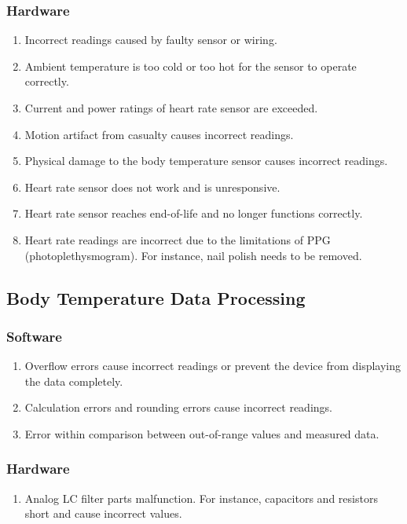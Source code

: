 \documentclass{article}
\begin{document}
        \subsubsection{Hardware}
        \begin{enumerate}[label = (\alph*)]
            \item Incorrect readings caused by faulty sensor or wiring.
            \item Ambient temperature is too cold or too hot for the sensor to operate correctly.
            \item Current and power ratings of heart rate sensor are exceeded.
            \item Motion artifact from casualty causes incorrect readings.
            \item Physical damage to the body temperature sensor causes incorrect readings.
            \item Heart rate sensor does not work and is unresponsive.
            \item Heart rate sensor reaches end-of-life and no longer functions correctly.
            \item Heart rate readings are incorrect due to the limitations of PPG (photoplethysmogram).  For instance, nail polish needs to be removed.
        \end{enumerate}
        
    \subsection{Body Temperature Data Processing}
        \subsubsection{Software}
        \begin{enumerate} [label = (\alph*)]
            \item Overflow errors cause incorrect readings or prevent the device from displaying the data completely.
            \item Calculation errors and rounding errors cause incorrect readings.
            \item Error within comparison between out-of-range values and measured data.
        \end{enumerate}
        \subsubsection{Hardware}
        \begin{enumerate} [label = (\alph*)]
            \item Analog LC filter parts malfunction.  For instance, capacitors and resistors short and cause incorrect values.
        \end{enumerate}
    
\end{document}
